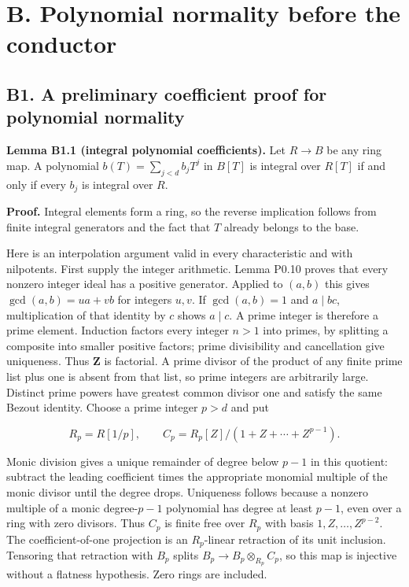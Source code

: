 \documentclass[11pt,a4paper,openany]{report}
\begin{document}
\section{B. Polynomial normality before the conductor}\label{AG-RG-S04-b.-polynomial-normality-before-the-conductor}

\subsection{B1. A preliminary coefficient proof for polynomial normality}\label{AG-RG-S04-b1.-a-preliminary-coefficient-proof-for-polynomial-normality}

\textbf{Lemma B1.1 (integral polynomial coefficients).} Let \(R\to B\) be any ring map. A polynomial \(b(T)=\sum_{j<d}b_jT^j\) in \(B[T]\) is integral over \(R[T]\) if and only if every \(b_j\) is integral over \(R\).

\textbf{Proof.} Integral elements form a ring, so the reverse implication follows from finite integral generators and the fact that \(T\) already belongs to the base.

Here is an interpolation argument valid in every characteristic and with nilpotents. First supply the integer arithmetic. Lemma P0.10 proves that every nonzero integer ideal has a positive generator. Applied to \((a,b)\) this gives \(\gcd(a,b)=ua+vb\) for integers \(u,v\). If \(\gcd(a,b)=1\) and \(a\mid bc\), multiplication of that identity by \(c\) shows \(a\mid c\). A prime integer is therefore a prime element. Induction factors every integer \(n>1\) into primes, by splitting a composite into smaller positive factors; prime divisibility and cancellation give uniqueness. Thus \(\mathbf Z\) is factorial. A prime divisor of the product of any finite prime list plus one is absent from that list, so prime integers are arbitrarily large. Distinct prime powers have greatest common divisor one and satisfy the same Bezout identity. Choose a prime integer \(p>d\) and put

\[
R_p=R[1/p],\qquad
C_p=R_p[Z]/(1+Z+\cdots+Z^{p-1}).
\]

Monic division gives a unique remainder of degree below \(p-1\) in this quotient: subtract the leading coefficient times the appropriate monomial multiple of the monic divisor until the degree drops. Uniqueness follows because a nonzero multiple of a monic degree-\(p-1\) polynomial has degree at least \(p-1\), even over a ring with zero divisors. Thus \(C_p\) is finite free over \(R_p\) with basis \(1,Z,\ldots,Z^{p-2}\). The coefficient-of-one projection is an \(R_p\)-linear retraction of its unit inclusion. Tensoring that retraction with \(B_p\) splits \(B_p\to B_p\otimes_{R_p}C_p\), so this map is injective without a flatness hypothesis. Zero rings are included.
\end{document}
